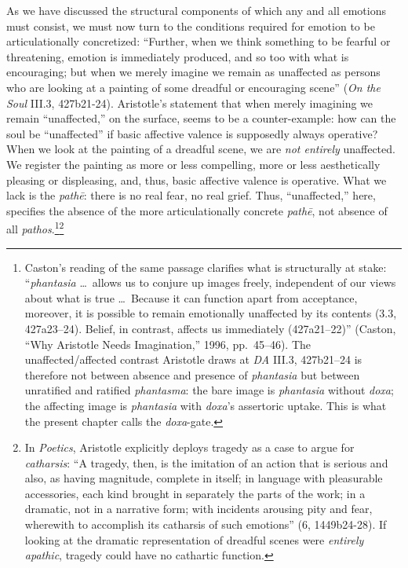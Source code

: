 \documentclass{article}
\begin{document}
As we have discussed the structural components of which any and all emotions must consist, we must now turn to the conditions required for emotion to be articulationally concretized: ``Further, when we think something to be fearful or threatening, emotion is immediately produced, and so too with what is encouraging; but when we merely imagine we remain as unaffected as persons who are looking at a painting of some dreadful or encouraging scene'' (\textit{On the Soul} III.3, 427b21-24). Aristotle's statement that when merely imagining we remain ``unaffected,'' on the surface, seems to be a counter-example: how can the soul be ``unaffected'' if basic affective valence is supposedly always operative? When we look at the painting of a dreadful scene, we are \textit{not entirely} unaffected. We register the painting as more or less compelling, more or less aesthetically pleasing or displeasing, and, thus, basic affective valence is operative. What we lack is the \textit{pathē}: there is no real fear, no real grief. Thus, ``unaffected,'' here, specifies the absence of the more articulationally concrete \textit{pathē}, not absence of all \textit{pathos}.\footnote{Caston's reading of the same passage clarifies what is structurally at stake: ``\textit{phantasia} \ldots\ allows us to conjure up images freely, independent of our views about what is true \ldots\ Because it can function apart from acceptance, moreover, it is possible to remain emotionally unaffected by its contents (3.3, 427a23--24). Belief, in contrast, affects us immediately (427a21--22)'' (Caston, ``Why Aristotle Needs Imagination,'' 1996, pp.~45--46). The unaffected/affected contrast Aristotle draws at \textit{DA} III.3, 427b21--24 is therefore not between absence and presence of \textit{phantasia} but between unratified and ratified \textit{phantasma}: the bare image is \textit{phantasia} without \textit{doxa}; the affecting image is \textit{phantasia} with \textit{doxa}'s assertoric uptake. This is what the present chapter calls the \textit{doxa}-gate.}\footnote{In \textit{Poetics}, Aristotle explicitly deploys tragedy as a case to argue for \textit{catharsis}: ``A tragedy, then, is the imitation of an action that is serious and also, as having magnitude, complete in itself; in language with pleasurable accessories, each kind brought in separately the parts of the work; in a dramatic, not in a narrative form; with incidents arousing pity and fear, wherewith to accomplish its catharsis of such emotions'' (6, 1449b24-28). If looking at the dramatic representation of dreadful scenes were \textit{entirely apathic}, tragedy could have no cathartic function.} 
\end{document}
